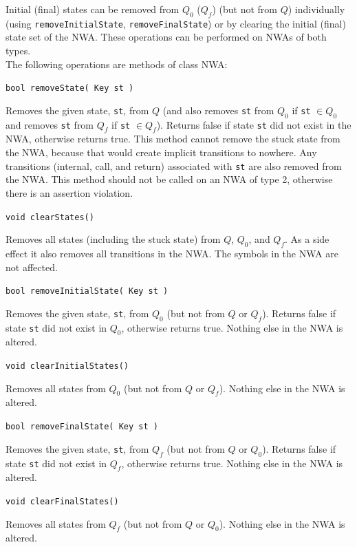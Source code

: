 \documentclass{llncs}
\begin{document}
Initial (final) states can be removed from $Q_0 $ ($Q_f$) (but not from $Q$)
individually (using \texttt{removeInitialState}, \texttt{removeFinalState})
or by clearing the initial (final) state set of the NWA.  These operations
can be performed on NWAs of both types. \\

\noindent The following operations are methods of class NWA:

\begin{description}

  \item\texttt{bool removeState( Key st )} \nopagebreak

    Removes the given state, \texttt{st}, from $Q$ (and also removes
    \texttt{st} from $Q_0$ if \texttt{st} $\in Q_0$ and removes \texttt{st}
    from $Q_f$ if \texttt{st} $\in Q_f$).  Returns false if state \texttt{st}
    did not exist in the NWA, otherwise returns true. This method cannot
    remove the stuck state from the NWA, because that would create implicit
    transitions to nowhere.  Any transitions (internal, call, and return)
    associated with \texttt{st} are also removed from the NWA.  This method
    should not be called on an NWA of type 2, otherwise there is an assertion
    violation.

  \item\texttt{void clearStates()} \nopagebreak

    Removes all states (including the stuck state) from $Q$, $Q_0$, and
    $Q_f$.  As a side effect it also removes all transitions in the NWA.  The
    symbols in the NWA are not affected.

  \item\texttt{bool removeInitialState( Key st )} \nopagebreak

    Removes the given state, \texttt{st}, from $Q_0$ (but not from $Q$ or
    $Q_f$).  Returns false if state \texttt{st} did not exist in $Q_0$,
    otherwise returns true.  Nothing else in the NWA is altered.

  \item\texttt{void clearInitialStates()} \nopagebreak

    Removes all states from $Q_0$ (but not from $Q$ or $Q_f$).  Nothing else
    in the NWA is altered.

  \item\texttt{bool removeFinalState( Key st )} \nopagebreak

    Removes the given state, \texttt{st}, from $Q_f$ (but not from $Q$ or
    $Q_0$).  Returns false if state \texttt{st} did not exist in $Q_f$,
    otherwise returns true.  Nothing else in the NWA is altered.

  \item\texttt{void clearFinalStates()} \nopagebreak

    Removes all states from $Q_f$ (but not from $Q$ or $Q_0$).  Nothing else
    in the NWA is altered. \\

\end{description}
\end{document}
